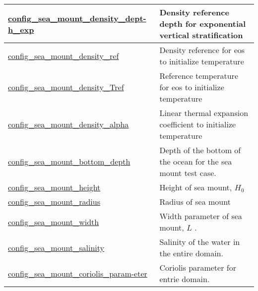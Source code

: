 {\begin{center}
\begin{longtable}{| p{2.0in} || p{4.0in} |}
    \hline
    \hyperref[subsec:nm_sec_config_sea_mount_density_depth_exp]{config\_sea\_mount\_density\_dept-}\hyperref[subsec:nm_sec_config_sea_mount_density_depth_exp]{h\_exp}& Density reference depth for exponential vertical stratification \\
    \hline
    \hyperref[subsec:nm_sec_config_sea_mount_density_ref]{config\_sea\_mount\_density\_ref} & Density reference for eos to initialize temperature \\
    \hline
    \hyperref[subsec:nm_sec_config_sea_mount_density_Tref]{config\_sea\_mount\_density\_Tref} & Reference temperature for eos to initialize temperature \\
    \hline
    \hyperref[subsec:nm_sec_config_sea_mount_density_alpha]{config\_sea\_mount\_density\_alpha} & Linear thermal expansion coefficient to initialize temperature \\
    \hline
    \hyperref[subsec:nm_sec_config_sea_mount_bottom_depth]{config\_sea\_mount\_bottom\_depth} & Depth of the bottom of the ocean for the sea mount test case. \\
    \hline
    \hyperref[subsec:nm_sec_config_sea_mount_height]{config\_sea\_mount\_height} &  Height of sea mount,  $H_0$  \\
    \hline
    \hyperref[subsec:nm_sec_config_sea_mount_radius]{config\_sea\_mount\_radius} & Radius of sea mount \\
    \hline
    \hyperref[subsec:nm_sec_config_sea_mount_width]{config\_sea\_mount\_width} &  Width parameter of sea mount,  $L$ . \\
    \hline
    \hyperref[subsec:nm_sec_config_sea_mount_salinity]{config\_sea\_mount\_salinity} & Salinity of the water in the entire domain. \\
    \hline
    \hyperref[subsec:nm_sec_config_sea_mount_coriolis_parameter]{config\_sea\_mount\_coriolis\_param-}\hyperref[subsec:nm_sec_config_sea_mount_coriolis_parameter]{eter}& Coriolis parameter for entrie domain. \\
    \hline
\end{longtable}
\end{center}
}
